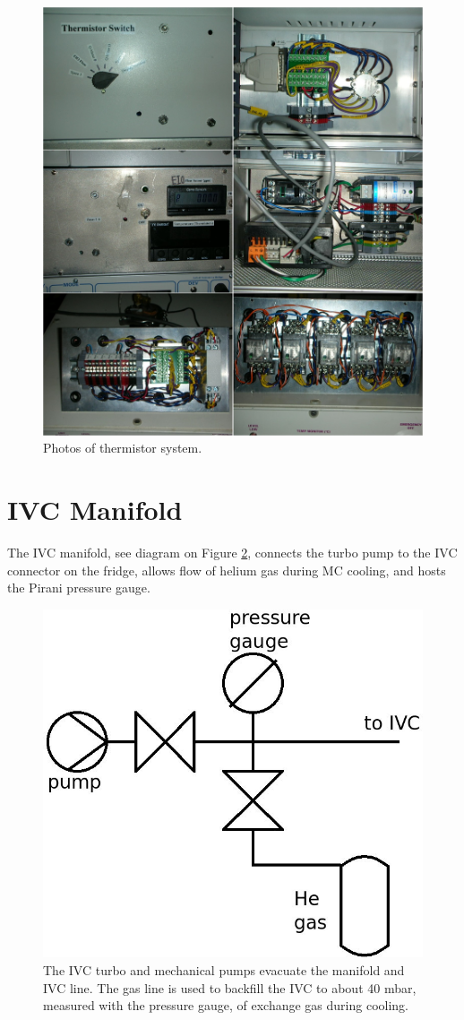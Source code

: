 \begin{figure}[!htbp]
 \centering
 \includegraphics[width=\textwidth]{./img/subsystem-thermistor-photos.png}
 \caption{Photos of thermistor system.}
 \label{fig:subsystem-thermistor-photos}
\end{figure}

\section{IVC Manifold}
The IVC manifold, see diagram on Figure \ref{fig:ivc-manifold-diagram}, connects the turbo pump to the IVC connector on the fridge, allows flow of helium gas during MC cooling, and hosts the Pirani pressure gauge.

\begin{figure}[htbp!]
 \centering
 \includegraphics[width=.5\textwidth]{./img/ivc-manifold-diagram.jpg}
 \caption{The IVC turbo and mechanical pumps evacuate the manifold and IVC line.  The gas line is used to backfill the IVC to about 40 mbar, measured with the pressure gauge, of exchange gas during cooling.}
 \label{fig:ivc-manifold-diagram}
\end{figure}

